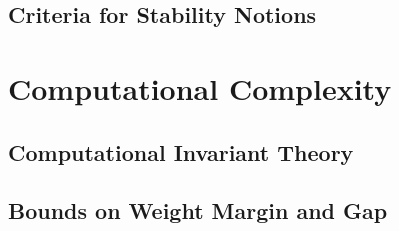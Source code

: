 \documentclass[12pt,a4paper]{book}
\theoremstyle{theorem}
\theoremstyle{definition}
\theoremstyle{remark}
\begin{document}




\chapter{Criteria for Stability Notions}\label{ch:CriteriaForStability}





\part{Computational Complexity}\label{part:CompComplexity}




\chapter{Computational Invariant Theory} \label{ch:CompInvariantTheory}






\chapter{Bounds on Weight Margin and Gap} \label{ch:BoundsMarginGap}
\end{document}

